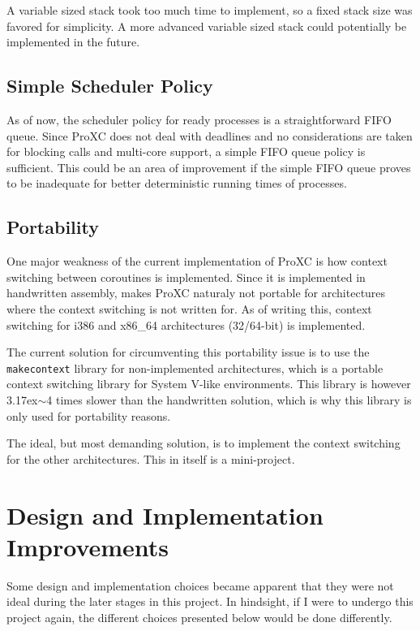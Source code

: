 A variable sized stack took too much time to implement, so a fixed stack size was favored for simplicity. A more advanced variable sized stack could potentially be implemented in the future. 

\subsection{Simple Scheduler Policy}

As of now, the scheduler policy for ready processes is a straightforward FIFO queue. Since ProXC does not deal with deadlines and no considerations are taken for blocking calls and multi\hyp{}core support, a simple FIFO queue policy is sufficient. This could be an area of improvement if the simple FIFO queue proves to be inadequate for better deterministic running times of processes. 

\subsection{Portability}
\label{sec:portability}

One major weakness of the current implementation of ProXC is how context switching between coroutines is implemented. Since it is implemented in handwritten assembly, makes ProXC naturaly not portable for architectures where the context switching is not written for. As of writing this, context switching for i386 and x86\_64 architectures (32/64\hyp{}bit) is implemented.

The current solution for circumventing this portability issue is to use the \texttt{makecontext} \citep{manmakecontext} library for non\hyp{}implemented architectures, which is a portable context switching library for System V\hyp{}like environments. This library is however 3{\raise.17ex\hbox{$\scriptstyle\mathtt{\sim}$}}4 times slower than the handwritten solution, which is why this library is only used for portability reasons. 

The ideal, but most demanding solution, is to implement the context switching for the other architectures. This in itself is a mini\hyp{}project.

\section{Design and Implementation Improvements}

Some design and implementation choices became apparent that they were not ideal during the later stages in this project. In hindsight, if I were to undergo this project again, the different choices presented below would be done differently.

